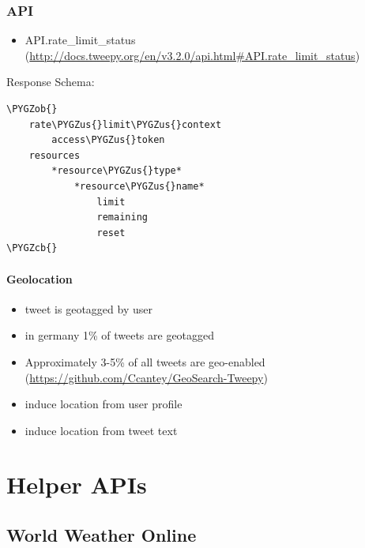 \documentclass[letterpaper,10pt,english]{sphinxmanual}
\def\PYGZus{\char`\_}
\def\PYGZob{\char`\{}
\def\PYGZcb{\char`\}}
\begin{document}
\subsection{API}
\label{main/twitter:id1}\begin{itemize}
\item {} 
API.rate\_limit\_status (\href{http://docs.tweepy.org/en/v3.2.0/api.html\#API.rate\_limit\_status}{http://docs.tweepy.org/en/v3.2.0/api.html\#API.rate\_limit\_status})

\end{itemize}

Response Schema:

\begin{Verbatim}[commandchars=\\\{\}]
\PYGZob{}
    rate\PYGZus{}limit\PYGZus{}context
        access\PYGZus{}token
    resources
        *resource\PYGZus{}type*
            *resource\PYGZus{}name*
                limit
                remaining
                reset
\PYGZcb{}
\end{Verbatim}


\subsubsection{Geolocation}
\label{main/twitter:geolocation}\begin{itemize}
\item {} 
tweet is geotagged by user

\item {} 
in germany 1\% of tweets are geotagged

\item {} 
Approximately 3-5\% of all tweets are geo-enabled (\href{https://github.com/Ccantey/GeoSearch-Tweepy}{https://github.com/Ccantey/GeoSearch-Tweepy})

\item {} 
induce location from user profile

\item {} 
induce location from tweet text

\end{itemize}


\chapter{Helper APIs}
\label{main/helper-apis::doc}\label{main/helper-apis:helper-apis}

\section{World Weather Online}
\label{main/helper-apis:world-weather-online}
\end{document}
